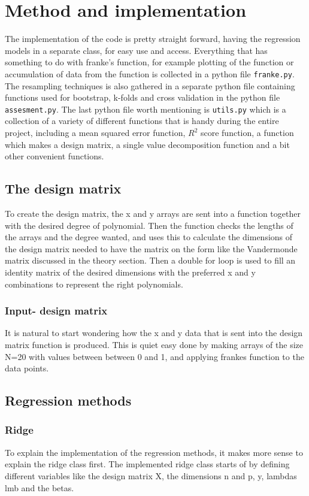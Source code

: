 \documentclass[../main.tex]{subfiles}
\begin{document}
\section{Method and implementation}\label{sec:method}
The implementation of the code is pretty straight forward, having the regression models in a separate class, for easy use and access. Everything that has something to do with franke's function, for example plotting of the function or accumulation of data from the function is collected in a python file \verb|franke.py|. The resampling techniques is also gathered in a separate python file containing functions used for bootstrap, k-folds and cross validation in the python file \verb|assesment.py|. The last python file worth mentioning is \verb|utils.py| which is a collection of a variety of different functions that is handy during the entire project, including a mean squared error function, $R^2$ score function, a function which makes a design matrix, a single value decomposition function and a bit other convenient functions.

\subsection{The design matrix}
To create the design matrix, the x and y arrays are sent into a function together with the desired degree of polynomial. Then the function checks the lengths of the arrays and the degree wanted, and uses this to calculate the dimensions of the design matrix needed to have the matrix on the form like the Vandermonde matrix discussed in the theory section. Then a double for loop is used to fill an identity matrix of the desired dimensions with the preferred x and y combinations to represent the right polynomials.

\subsubsection{Input- design matrix}
It is natural to start wondering how the x and y data that is sent into the design matrix function is produced. This is quiet easy done by making arrays of the size N=20 with values between between 0 and 1, and applying frankes function to the data points.

\subsection{Regression methods}
\subsubsection{Ridge}
To explain the implementation of the regression methods, it makes more sense to explain the ridge class first. The implemented ridge class starts of by defining different variables like the design matrix X, the dimensions n and p, y, lambdas lmb and the betas.
\end{document}

